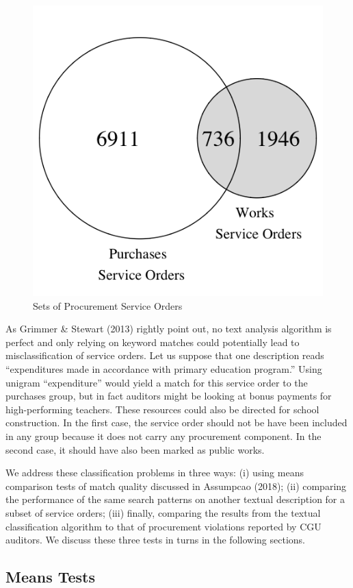\documentclass[]{article}
\theoremstyle{definition}
\theoremstyle{definition}
\theoremstyle{definition}
\theoremstyle{remark}
\begin{document}
\newpage

\begin{figure}[!htbp]

{\centering \includegraphics[width=0.3\linewidth]{venn} 

}

\caption{Sets of Procurement Service Orders}\label{fig:venn}
\end{figure}

As Grimmer \& Stewart (2013) rightly point out, no text analysis
algorithm is perfect and only relying on keyword matches could
potentially lead to misclassification of service orders. Let us suppose
that one description reads ``expenditures made in accordance with
primary education program.'' Using unigram ``expenditure'' would yield a
match for this service order to the purchases group, but in fact
auditors might be looking at bonus payments for high-performing
teachers. These resources could also be directed for school
construction. In the first case, the service order should not be have
been included in any group because it does not carry any procurement
component. In the second case, it should have also been marked as public
works.

We address these classification problems in three ways: (i) using means
comparison tests of match quality discussed in Assumpcao (2018); (ii)
comparing the performance of the same search patterns on another textual
description for a subset of service orders; (iii) finally, comparing the
results from the textual classification algorithm to that of procurement
violations reported by CGU auditors. We discuss these three tests in
turns in the following sections.

\hypertarget{quality1}{%
\subsection{Means Tests}\label{quality1}}
\end{document}
